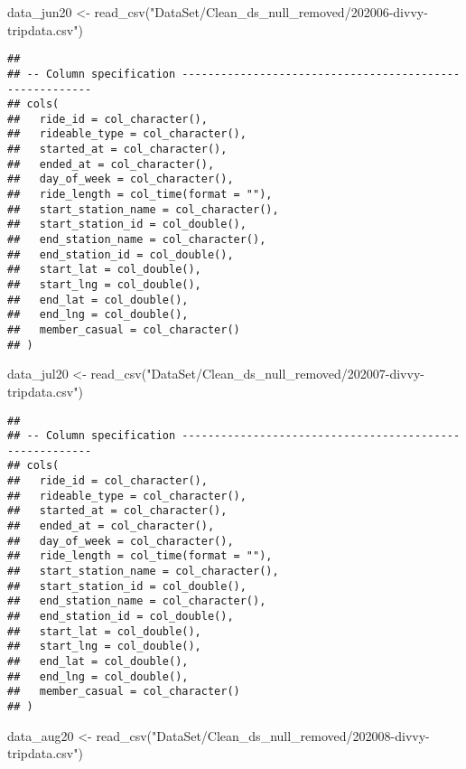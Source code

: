 \documentclass[
]{article}
\newenvironment{Shaded}{\begin{snugshade}}{\end{snugshade}}
\newcommand{\FunctionTok}[1]{\textcolor[rgb]{0.00,0.00,0.00}{#1}}
\newcommand{\NormalTok}[1]{#1}
\newcommand{\OtherTok}[1]{\textcolor[rgb]{0.56,0.35,0.01}{#1}}
\newcommand{\StringTok}[1]{\textcolor[rgb]{0.31,0.60,0.02}{#1}}
\begin{document}
\begin{Shaded}
\begin{Highlighting}[]
\NormalTok{data\_jun20 }\OtherTok{\textless{}{-}} \FunctionTok{read\_csv}\NormalTok{(}\StringTok{"DataSet/Clean\_ds\_null\_removed/202006{-}divvy{-}tripdata.csv"}\NormalTok{)}
\end{Highlighting}
\end{Shaded}

\begin{verbatim}
## 
## -- Column specification --------------------------------------------------------
## cols(
##   ride_id = col_character(),
##   rideable_type = col_character(),
##   started_at = col_character(),
##   ended_at = col_character(),
##   day_of_week = col_character(),
##   ride_length = col_time(format = ""),
##   start_station_name = col_character(),
##   start_station_id = col_double(),
##   end_station_name = col_character(),
##   end_station_id = col_double(),
##   start_lat = col_double(),
##   start_lng = col_double(),
##   end_lat = col_double(),
##   end_lng = col_double(),
##   member_casual = col_character()
## )
\end{verbatim}

\begin{Shaded}
\begin{Highlighting}[]
\NormalTok{data\_jul20 }\OtherTok{\textless{}{-}} \FunctionTok{read\_csv}\NormalTok{(}\StringTok{"DataSet/Clean\_ds\_null\_removed/202007{-}divvy{-}tripdata.csv"}\NormalTok{)}
\end{Highlighting}
\end{Shaded}

\begin{verbatim}
## 
## -- Column specification --------------------------------------------------------
## cols(
##   ride_id = col_character(),
##   rideable_type = col_character(),
##   started_at = col_character(),
##   ended_at = col_character(),
##   day_of_week = col_character(),
##   ride_length = col_time(format = ""),
##   start_station_name = col_character(),
##   start_station_id = col_double(),
##   end_station_name = col_character(),
##   end_station_id = col_double(),
##   start_lat = col_double(),
##   start_lng = col_double(),
##   end_lat = col_double(),
##   end_lng = col_double(),
##   member_casual = col_character()
## )
\end{verbatim}

\begin{Shaded}
\begin{Highlighting}[]
\NormalTok{data\_aug20 }\OtherTok{\textless{}{-}} \FunctionTok{read\_csv}\NormalTok{(}\StringTok{"DataSet/Clean\_ds\_null\_removed/202008{-}divvy{-}tripdata.csv"}\NormalTok{)}
\end{Highlighting}
\end{Shaded}
\end{document}
